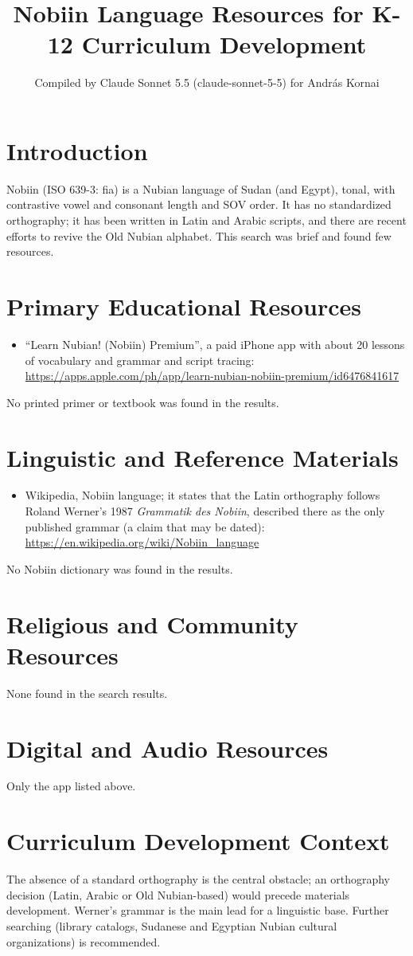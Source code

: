 \documentclass[12pt]{article}
\title{Nobiin Language Resources for K-12 Curriculum Development}
\author{Compiled by Claude Sonnet 5.5 (claude-sonnet-5-5) for Andr\'as Kornai}
\date{}
\begin{document}
\maketitle

\section{Introduction}
Nobiin (ISO 639-3: fia) is a Nubian language of Sudan (and Egypt), tonal, with contrastive vowel and consonant length and SOV order. It has no standardized orthography; it has been written in Latin and Arabic scripts, and there are recent efforts to revive the Old Nubian alphabet. This search was brief and found few resources.

\section{Primary Educational Resources}
\begin{itemize}
\item ``Learn Nubian! (Nobiin) Premium'', a paid iPhone app with about 20 lessons of vocabulary and grammar and script tracing: \url{https://apps.apple.com/ph/app/learn-nubian-nobiin-premium/id6476841617}
\end{itemize}
No printed primer or textbook was found in the results.

\section{Linguistic and Reference Materials}
\begin{itemize}
\item Wikipedia, Nobiin language; it states that the Latin orthography follows Roland Werner's 1987 \emph{Grammatik des Nobiin}, described there as the only published grammar (a claim that may be dated): \url{https://en.wikipedia.org/wiki/Nobiin_language}
\end{itemize}
No Nobiin dictionary was found in the results.

\section{Religious and Community Resources}
None found in the search results.

\section{Digital and Audio Resources}
Only the app listed above.

\section{Curriculum Development Context}
The absence of a standard orthography is the central obstacle; an orthography decision (Latin, Arabic or Old Nubian-based) would precede materials development. Werner's grammar is the main lead for a linguistic base. Further searching (library catalogs, Sudanese and Egyptian Nubian cultural organizations) is recommended.
\end{document}

